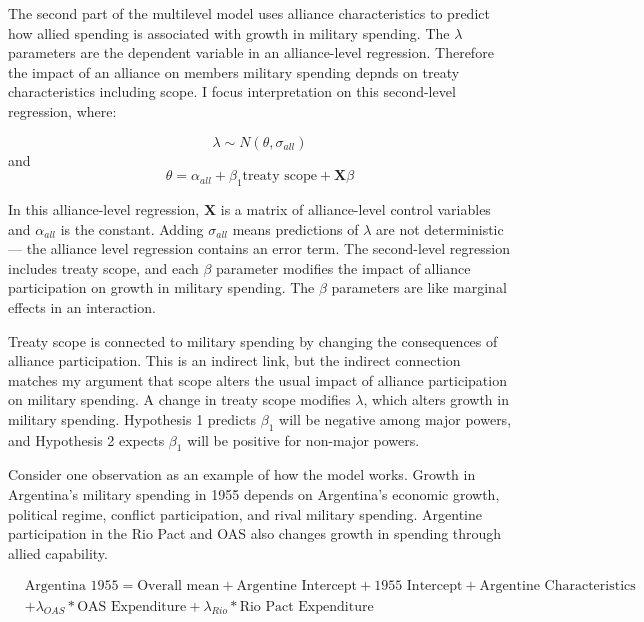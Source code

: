 \documentclass[12pt]{article}
\begin{document}
The second part of the multilevel model uses alliance characteristics to predict how allied spending is associated with growth in military spending. 
The $\lambda$ parameters are the dependent variable in an alliance-level regression.
Therefore the impact of an alliance on members military spending depnds on treaty characteristics including scope. 
I focus interpretation on this second-level regression, where: 

\begin{equation}
\lambda \sim N(\theta, \sigma_{all})
\end{equation} 
and 
\begin{equation}
\theta = \alpha_{all} + \beta_1 \mbox{treaty scope} + \textbf{X} \beta
\end{equation}


In this alliance-level regression, $\textbf{X}$ is a matrix of alliance-level control variables and $\alpha_{all}$ is the constant.
Adding $\sigma_{all}$ means predictions of $\lambda$ are not deterministic--- the alliance level regression contains an error term. 
The second-level regression includes treaty scope, and each $\beta$ parameter modifies the impact of alliance participation on growth in military spending. 
The $\beta$ parameters are like marginal effects in an interaction. 


Treaty scope is connected to military spending by changing the consequences of alliance participation.
This is an indirect link, but the indirect connection matches my argument that scope alters the usual impact of alliance participation on military spending.  
A change in treaty scope modifies $\lambda$, which alters growth in military spending.
Hypothesis 1 predicts $\beta_1$ will be negative among major powers, and Hypothesis 2 expects $\beta_1$ will be positive for non-major powers.  


Consider one observation as an example of how the model works. 
Growth in Argentina's military spending in 1955 depends on Argentina's economic growth, political regime, conflict participation, and rival military spending. 
Argentine participation in the Rio Pact and OAS also changes growth in spending through allied capability. 


\begin{equation}
\begin{split}
& \mbox{Argentina 1955} = \mbox{Overall mean}
+ \mbox{Argentine Intercept} + \mbox{1955 Intercept} 
+ \mbox{Argentine Characteristics} \\
& + \lambda_{OAS} * \mbox{OAS Expenditure} + \lambda_{Rio} * \mbox{Rio Pact Expenditure}
\end{split} 
\end{equation}
\end{document}
